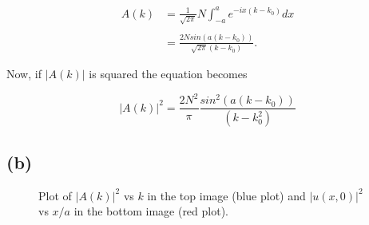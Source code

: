 \documentclass[11pt]{article}
\begin{document}
\begin{align*}
A(k) &= \frac{1}{\sqrt{2\pi}} N \int_{-a}^{a} e^{-ix(k - k_{0})}dx \\\\
&= \frac{2Nsin(a(k - k_{0}))}{\sqrt{2\pi}(k - k_{0})}.
\end{align*}

Now, if $|A(k)|$ is squared the equation becomes

$$
|A(k)|^{2} = \frac{2N^{2}}{\pi}\frac{sin^{2}(a(k - k_{0}))}{(k - k_{0}^{2})}
$$

\clearpage

\subsection*{(b)}

\begin{figure}[h!]%
    \centering
    \qquad
    \caption{Plot of  $|A(k)|^{2}$ vs $k$ in the top image (blue plot) and $|u(x, 0)|^{2}$ vs $x/a$ in the bottom image (red plot).}
    \label{fig:example}%
\end{figure}
\end{document}
